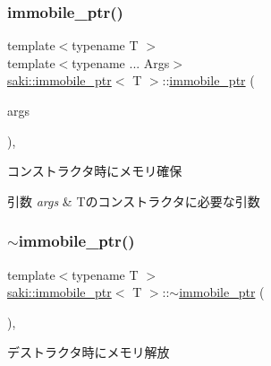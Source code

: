 \subsubsection{\texorpdfstring{immobile\+\_\+ptr()}{immobile\_ptr()}\hspace{0.1cm}{\footnotesize\ttfamily [1/3]}}
{\footnotesize\ttfamily template$<$typename T $>$ \\
template$<$typename ... Args$>$ \\
\mbox{\hyperlink{classsaki_1_1immobile__ptr}{saki\+::immobile\+\_\+ptr}}$<$ T $>$\+::\mbox{\hyperlink{classsaki_1_1immobile__ptr}{immobile\+\_\+ptr}} (\begin{DoxyParamCaption}\item[{Args...}]{args }\end{DoxyParamCaption})\hspace{0.3cm}{\ttfamily [inline]}, {\ttfamily [explicit]}}



コンストラクタ時にメモリ確保 


\begin{DoxyParams}{引数}
{\em args} & Tのコンストラクタに必要な引数 \\
\hline
\end{DoxyParams}
\mbox{\label{classsaki_1_1immobile__ptr_a7cb3ccfa2a366adfe164a0ba6c0f86d6}} 
\subsubsection{\texorpdfstring{$\sim$immobile\+\_\+ptr()}{~immobile\_ptr()}}
{\footnotesize\ttfamily template$<$typename T $>$ \\
\mbox{\hyperlink{classsaki_1_1immobile__ptr}{saki\+::immobile\+\_\+ptr}}$<$ T $>$\+::$\sim$\mbox{\hyperlink{classsaki_1_1immobile__ptr}{immobile\+\_\+ptr}} (\begin{DoxyParamCaption}{ }\end{DoxyParamCaption})\hspace{0.3cm}{\ttfamily [inline]}, {\ttfamily [noexcept]}}



デストラクタ時にメモリ解放 

\mbox{\label{classsaki_1_1immobile__ptr_ad0648153ed2d219d9cdf338a106de07c}} 
